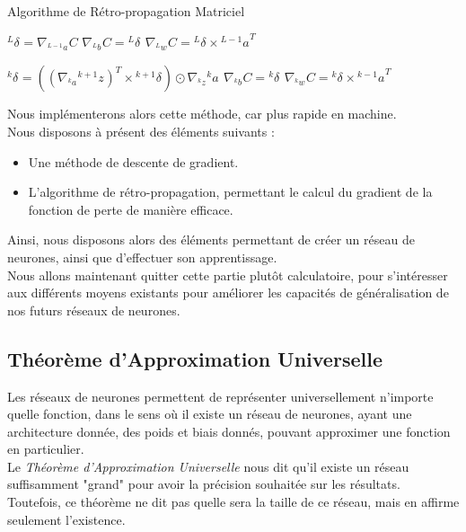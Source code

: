 \documentclass[10pt,a4paper]{report}
\newcommand{\lexp}[1]{\phantom{}^{#1}}
\newcommand{\elem}[4]{\lexp{#2}#1^{#3}_{#4}}
\begin{document}
		\begin{algorithm}[H]
			\caption{Algorithme de Rétro-propagation Matriciel}
			\begin{algorithmic}
			    \STATE
			    \STATE $\elem{\delta}{L}{}{} = \nabla_{\elem{a}{L-1}{}{}} C$
			    \STATE $\nabla_{\elem{b}{L}{}{}} C = \elem{\delta}{L}{}{}$
			    \STATE $\nabla_{\elem{w}{L}{}{}} C = \elem{\delta}{L}{}{} \times{\elem{a}{L-1}{}{}}^T $
			    
			    	\STATE
			    	\STATE $\elem{\delta}{k}{}{} = ((\nabla_{\elem{a}{k}{}{}}\elem{z}{k+1}{}{})^T \times \elem{\delta}{k+1}{}{}) \odot \nabla_{\elem{z}{k}{}{}}{\elem{a}{k}{}{}}$
			    	\STATE $\nabla_{\elem{b}{k}{}{}} C = \elem{\delta}{k}{}{}$
			    	\STATE $\nabla_{\elem{w}{k}{}{}} C = \elem{\delta}{k}{}{} \times{\elem{a}{k-1}{}{}}^T $
			    \ENDFOR
			\end{algorithmic}
		\end{algorithm}
		Nous implémenterons alors cette méthode, car plus rapide en machine.\\
		Nous disposons à présent des éléments suivants :
		\begin{itemize}
			\item Une méthode de descente de gradient.
			\item L'algorithme de rétro-propagation, permettant le calcul du gradient de la fonction de perte de manière efficace.
		\end{itemize}
		Ainsi, nous disposons alors des éléments permettant de créer un réseau de neurones, ainsi que d'effectuer son apprentissage.\\
		Nous allons maintenant quitter cette partie plutôt calculatoire, pour s'intéresser aux différents moyens existants pour améliorer les capacités de généralisation de nos futurs réseaux de neurones.
		\subsection{Théorème d'Approximation Universelle}
		Les réseaux de neurones permettent de représenter universellement n'importe quelle fonction, dans le sens où il existe un réseau de neurones, ayant une architecture donnée, des poids et biais donnés, pouvant approximer une fonction en particulier.\\
		Le \emph{Théorème d'Approximation Universelle} nous dit qu'il existe un réseau suffisamment "grand" pour avoir la précision souhaitée sur les résultats.\\
		Toutefois, ce théorème ne dit pas quelle sera la taille de ce réseau, mais en affirme seulement l'existence.
\end{document}
